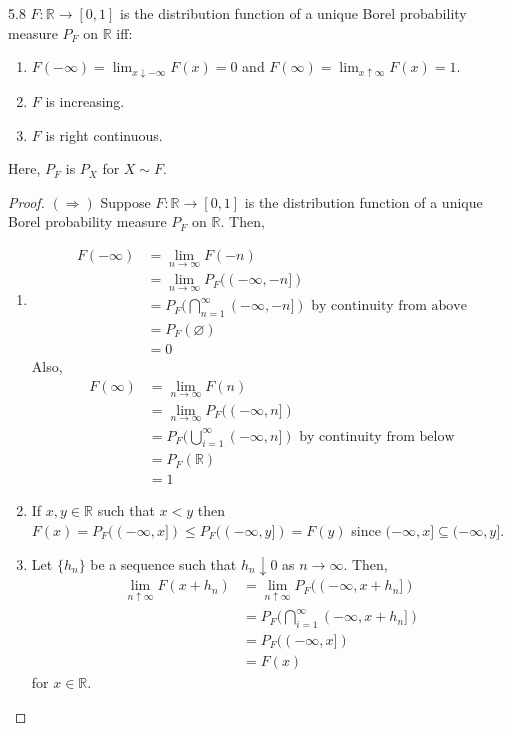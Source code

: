 \documentclass{article}
\newcommand{\R}{\mathbb{R}}
\begin{document}
	\begin{mythm}{}{5.8}
		$F : \R\to[0, 1]$ is the distribution function of a unique Borel probability measure $P_F$ on $\R$ iff:
		\begin{enumerate}[label=(\roman*)]
			\item $F(-\infty)=\lim_{x\downarrow-\infty}F(x)=0$ and $F(\infty)=\lim_{x\uparrow\infty}F(x)=1$.
			
			\item $F$ is increasing.
			
			\item $F$ is right continuous.
		\end{enumerate}
		Here, $P_F$ is $P_X$ for $X\sim F$.
		
		\begin{proof}
			$(\Rightarrow)$ Suppose $F : \R\to[0, 1]$ is the distribution function of a unique Borel probability measure $P_F$ on $\R$. Then,\\
			\begin{enumerate}[label=(\roman*)]
				\item
				\begin{align*}
					F(-\infty)&=\lim_{n\to\infty}F(-n)\\
					&=\lim_{n\to\infty}P_F((-\infty, -n ])\\
					&=P_F(\bigcap_{n=1}^{\infty}(-\infty, -n])\mbox{ by continuity from above}\\
					&=P_F(\varnothing)\\
					&=0
				\end{align*}
				Also,
				\begin{align*}
					F(\infty)&=\lim_{n\to\infty}F(n)\\
					&=\lim_{n\to\infty}P_F((-\infty, n])\\
					&=P_F(\bigcup_{i=1}^{\infty}(-\infty, n])\mbox{ by continuity from below}\\
					&=P_F(\R)\\
					&=1
				\end{align*}
				
				\item If $x, y\in\R$ such that $x<y$ then $F(x)=P_F((-\infty, x])\leq P_F((-\infty, y])=F(y)$ since $(-\infty, x]\subseteq(-\infty, y]$.
				
				\item Let $\{h_n\}$ be a sequence such that $h_n\downarrow0$ as $n\to\infty$. Then,
				\begin{align*}
					\lim_{n\uparrow\infty}F(x+h_n)&=\lim_{n\uparrow\infty}P_F((-\infty, x+h_n])\\
					&=P_F(\bigcap_{i=1}^{\infty}(-\infty, x+h_n])\\
					&=P_F((-\infty, x])\\
					&=F(x)
				\end{align*}
				for $x\in\R$.\\
				

\end{enumerate}
\end{proof}
\end{mythm}
\end{document}
